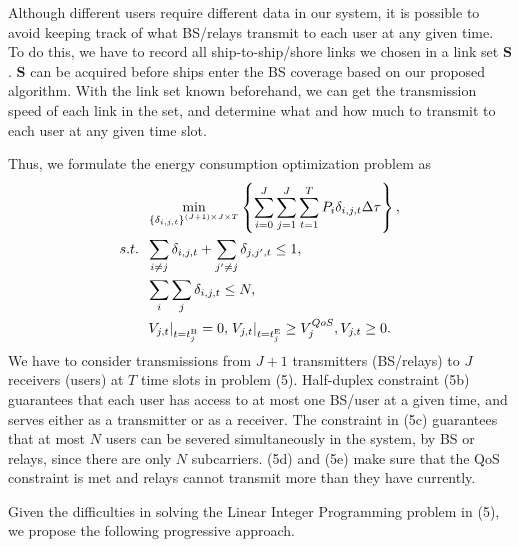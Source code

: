 \documentclass[conference]{IEEEtran}
\begin{document}
 Although different users require different data in our system, it is possible to avoid keeping track of what BS/relays transmit to each user at any given time. To do this, we have to record all ship-to-ship/shore links we chosen in a link set ${\mathbf{S}}$. ${\mathbf{S}}$ can be acquired before ships enter the BS coverage based on our proposed algorithm. With the link set known beforehand, we can get the transmission speed of each link in the set, and determine what and how much to transmit to each user at any given time slot.
 
 Thus, we formulate the energy consumption optimization problem as
 \begin{subequations}
 \begin{align}
 & \mathop {\min }\limits_{{\left\{ {{\delta _{i,j,t}}} \right\}^{\left( {J + 1} \right) \times J \times T}}} \left\{ {\sum\limits_{i = 0}^J {\sum\limits_{j = 1}^J {\sum\limits_{t = 1}^{T} {{P_{i}}\delta _{i,j,t} \Delta \tau } } } } \right\} ,\\
  {s.t.} \;\; &\sum\limits_{i \ne j} {{{\delta _{i,j,t}}} } + \sum\limits_{j' \ne j} { {{\delta _{j,j',t}}} \le {1}} ,\\
  \;\;\;\;\;\; &\sum\limits_i {\sum\limits_j { {{\delta _{i,j,t}}} } } \le N ,\\
  \;\;\;\;\;\; &{{{\left. {{V_{j,t}}} \right|}_{t = t_j^{{\rm{B}}}}} = 0, \left. {{V_{j,t}}} \right|_{t = t_j^{{\rm{E}}}}} \ge V_j^{QoS}, {V_{j,t}} \ge 0.
 \end{align}
 \end{subequations}
 We have to consider transmissions from ${J + 1}$ transmitters (BS/relays) to $J$ receivers (users) at $T$ time slots in problem (5). 
 Half-duplex constraint (5b) guarantees that each user has access to at most one BS/user at a given time, and serves either as a transmitter or as a receiver. The constraint in (5c) guarantees that at most $N$ users can be severed simultaneously in the system, by BS or relays, since there are only $N$ subcarriers. (5d) and (5e) make sure that the QoS constraint is met and relays cannot transmit more than they have currently.
 
 Given the difficulties in solving the Linear Integer Programming problem in (5), we propose the following progressive approach. 
 
 
\end{document}
